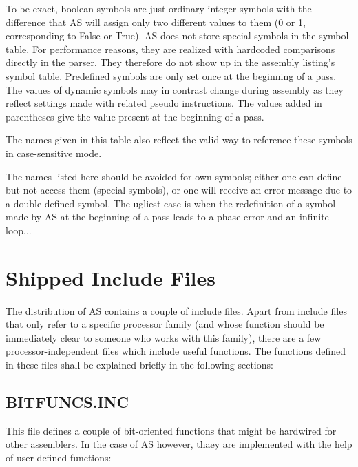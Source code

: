 \documentclass[12pt,twoside]{report}
\begin{document}
To be exact, boolean symbols are just ordinary integer symbols with the
difference that AS will assign only two different values to them (0 or 1,
corresponding to False or True).  AS does not store special symbols
in the symbol table.  For performance reasons, they are realized with
hardcoded comparisons directly in the parser.  They therefore do not
show up in the assembly listing's symbol table.  Predefined symbols
are only set once at the beginning of a pass.  The values of dynamic
symbols may in contrast change during assembly as they reflect
settings made with related pseudo instructions.  The values added in
parentheses give the value present at the beginning of a pass.

The names given in this table also reflect the valid way to reference
these symbols in case-sensitive mode.

The names listed here should be avoided for own symbols; either one
can define but not access them (special symbols), or one will receive
an error message due to a double-defined symbol.  The ugliest case is
when the redefinition of a symbol made by AS at the beginning of a
pass leads to a phase error and an infinite loop...


\cleardoublepage
\chapter{Shipped Include Files}

The distribution of AS contains a couple of include files.  Apart from
include files that only refer to a specific processor family (and whose
function should be immediately clear to someone who works with this
family), there are a few processor-independent files which include useful
functions.  The functions defined in these files shall be explained
briefly in the following sections:

\section{BITFUNCS.INC}

This file defines a couple of bit-oriented functions that might be
hardwired for other assemblers.  In the case of AS however, thaey are
implemented with the help of user-defined functions:
\end{document}
